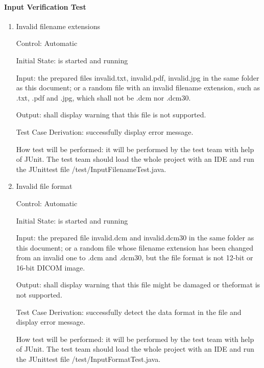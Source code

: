 \documentclass[12pt, titlepage]{article}
\begin{document}
\paragraph{Input Verification Test}

\begin{enumerate}

\item{Invalid filename extensions}

Control: Automatic
					
Initial State: \progname{} is started and running
					
Input: the prepared files invalid.txt, invalid.pdf, invalid.jpg in the same
folder as this document; or a random file with an invalid filename extension,
such as .txt, .pdf and .jpg, which shall not be .dcm nor .dcm30.
					
Output: \progname{} shall display warning that this file is not supported.

Test Case Derivation: successfully display error message.
					
How test will be performed: it will be performed by the test team with help of
JUnit. The test team should load the whole project with an IDE and run the
JUnittest file /test/InputFilenameTest.java. 

					
\item{Invalid file format}

Control: Automatic
					
Initial State: \progname{} is started and running
					
Input: the prepared file invalid.dcm and invalid.dcm30 in the same folder as
this document; or a random file whose filename extension has been changed from
an invalid one to .dcm and .dcm30, but the file format is not 12-bit or 16-bit
DICOM image.
					
Output: \progname{} shall display warning that this file might be damaged or
theformat is not supported.

Test Case Derivation: successfully detect the data format in the file and
display error message. 

How test will be performed: it will be performed by the test team with help of
JUnit. The test team should load the whole project with an IDE and run the
JUnittest file /test/InputFormatTest.java. 


\end{enumerate}
\end{document}
